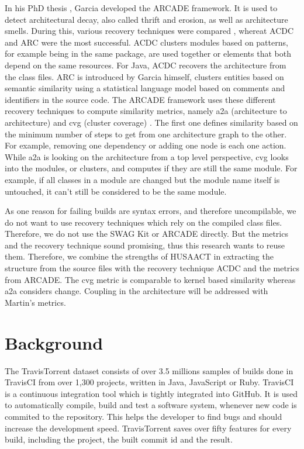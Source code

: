 \documentclass[conference]{IEEEtran}
\begin{document}
In his PhD thesis \cite{arcade-thesis}, Garcia developed the ARCADE framework. It is used to detect architectural decay, also called thrift and erosion, as well as architecture smells. During this, various recovery techniques were compared \cite{arcRec-comparison}, whereat ACDC \cite{ACDC} and ARC were the most successful. 
ACDC clusters modules based on patterns, for example being in the same package, are used together or elements that both depend on the same resources. For Java, ACDC recovers the architecture from the class files. ARC is introduced by Garcia himself, clusters entities based on semantic similarity using a statistical language model based on comments and identifiers in the source code.
The ARCADE framework uses these different recovery techniques to compute similarity metrics, namely a2a (architecture to architecture) and cvg (cluster coverage) \cite{Arcade}. The first one defines similarity based on the minimum number of steps to get from one architecture graph to the other. For example, removing one dependency or adding one node is each one action. While a2a is looking on the architecture from a top level perspective, cvg looks into the modules, or clusters, and computes if they are still the same module. For example, if all classes in a module are changed but the module name itself is untouched, it can't still be considered to be the same module.

As one reason for failing builds are syntax errors, and therefore uncompilable, we do not want to use recovery techniques which rely on the compiled class files. Therefore, we do not use the SWAG Kit or ARCADE directly.
But the metrics and the recovery technique sound promising, thus this research wants to reuse them. Therefore, we combine the strengths of HUSAACT in extracting the structure from the source files with the recovery technique ACDC and the metrics from ARCADE. The cvg metric is comparable to kernel based similarity whereas a2a considers change. Coupling in the architecture will be addressed with Martin's metrics.

\section{Background}

The TravisTorrent dataset \cite{TravisTorrent} consists of over 3.5 millions samples of builds done in TravisCI from over 1,300 projects, written in Java, JavaScript or Ruby. TravisCI is a continuous integration tool which is tightly integrated into GitHub. It is used to automatically compile, build and test a software system, whenever new code is commited to the repository. This helps the developer to find bugs and should increase the development speed. 
TravisTorrent saves over fifty features for every build, including the project, the built commit id and the result.
\end{document}
